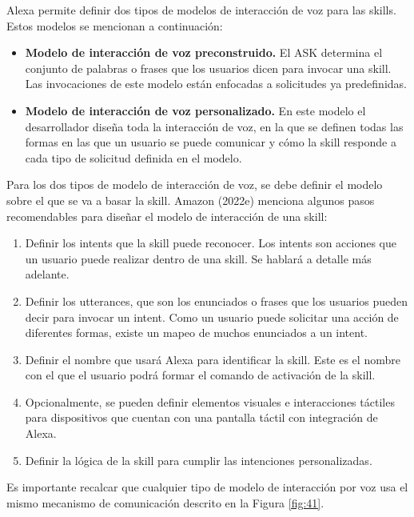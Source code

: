 Alexa permite definir dos tipos de modelos de interacción de voz para las skills. Estos modelos se mencionan a continuación:

\begin{itemize}
  \item \textbf{Modelo de interacción de voz preconstruido.} El ASK determina el conjunto de palabras o frases que los usuarios dicen para invocar una skill. Las invocaciones de este modelo están enfocadas a solicitudes ya predefinidas.
  \item \textbf{Modelo de interacción de voz personalizado.} En este modelo el desarrollador diseña toda la interacción de voz, en la que se definen todas las formas en las que un usuario se puede comunicar y cómo la skill responde a cada tipo de solicitud definida en el modelo.
\end{itemize}

Para los dos tipos de modelo de interacción de voz, se debe definir el modelo sobre el que se va a basar la skill. Amazon (2022e) menciona algunos pasos recomendables para diseñar el modelo de interacción de una skill:

\begin{enumerate}
  \item Definir los intents que la skill puede reconocer. Los intents son acciones que un usuario puede realizar dentro de una skill. Se hablará a detalle más adelante.
  \item Definir los utterances, que son los enunciados o frases que los usuarios pueden decir para invocar un intent. Como un usuario puede solicitar una acción de diferentes formas, existe un mapeo de muchos enunciados a un intent.
  \item Definir el nombre que usará Alexa para identificar la skill. Este es el nombre con el que el usuario podrá formar el comando de activación de la skill.
  \item Opcionalmente, se pueden definir elementos visuales e interacciones táctiles para dispositivos que cuentan con una pantalla táctil con integración de Alexa.
  \item Definir la lógica de la skill para cumplir las intenciones personalizadas.
\end{enumerate}

Es importante recalcar que cualquier tipo de modelo de interacción por voz usa el mismo mecanismo de comunicación descrito en la Figura \ref{fig:41}.


